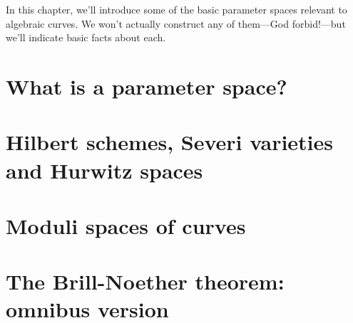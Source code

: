 In this chapter, we'll introduce some of the basic parameter spaces relevant to algebraic curves. We won't actually construct any of them---God forbid!---but we'll indicate basic facts about each.

\section{What is a parameter space?}

\section{Hilbert schemes, Severi varieties and Hurwitz spaces}

\section{Moduli spaces of curves}

\section{The Brill-Noether theorem: omnibus version}\label{BNomnibus}

